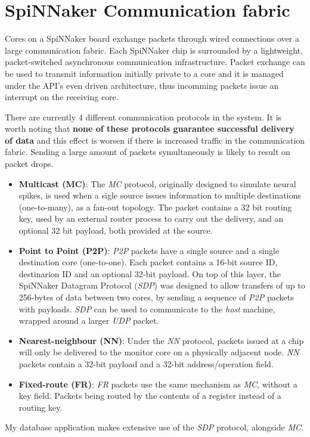 \section{SpiNNaker Communication fabric}
\label{sec:comm_fabric}

Cores on a SpiNNaker board exchange packets through wired connections over a large communication fabric. Each SpiNNaker chip is surrounded by a lightweight, packet-switched asynchronous communication infrastructure.\cite{spinnchip} Packet exchange can be used to transmit information initially private to a core and it is managed under the API's even driven architecture, thus incomming packets issue an interrupt on the receiving core.

There are currently 4 different communication protocols in the system. It is worth noting that \textbf{none of these protocols guarantee successful delivery of data} and this effect is worsen if there is increased traffic in the communication fabric. Sending a large amount of packets symultaneously is likely to result on packet drops.

\begin{itemize}
\item \textbf{Multicast (MC)}: The \textit{MC} protocol, originally designed to simulate neural spikes, is used when a sigle source issues information to multiple destinations (one-to-many), as a fan-out topology.\cite{overviewspinn} The packet contains a 32 bit routing key, used by an external router process to carry out the delivery, and an optional 32 bit payload, both provided at the source.

\item \textbf{Point to Point (P2P)}: \textit{P2P} packets have a single source and a single destination core (one-to-one). Each packet contains a 16-bit source ID, destinarion ID and an optional 32-bit payload.\cite{datasheet}
On top of this layer, the SpiNNaker Datagram Protocol (\textit{SDP}) was designed to allow transfers of up to 256-bytes of data between two cores, by sending a sequence of \textit{P2P} packets with payloads.\cite{sdp} \textit{SDP} can be used to communicate to the \textit{host} machine, wrapped around a larger \textit{UDP} packet.

\item \textbf{Nearest-neighbour (NN)}: Under the \textit{NN} protocol, packets issued at a chip will only be delivered to the monitor core on a physically adjacent node.\cite{overviewspinn} \textit{NN} packets contain a 32-bit payload and a 32-bit address/operation field.\cite{datasheet}

\item \textbf{Fixed-route (FR)}: \textit{FR} packets use the same mechanism as \textit{MC}, without a key field. Packets being routed by the contents of a register instead of a routing key. 
\end{itemize}

My database application makes extensive use of the \textit{SDP} protocol, alongside \textit{MC}.



